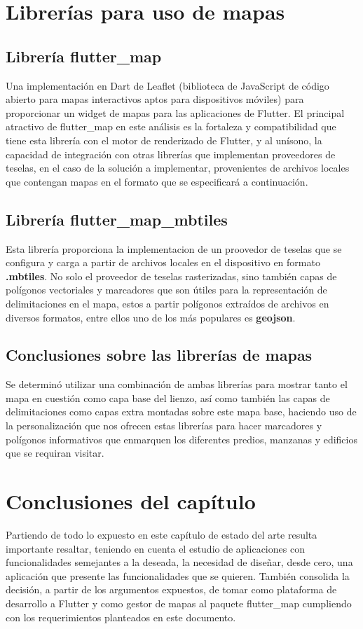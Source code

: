 \section{Librerías para uso de mapas}
\subsection{Librería flutter\_map}
Una implementación en Dart de Leaflet (biblioteca de JavaScript de código abierto
para mapas interactivos aptos para dispositivos móviles) para proporcionar un widget de
mapas para las aplicaciones de Flutter.
El principal atractivo de flutter\_map \cite{flutterMap} en este análisis es la fortaleza y compatibilidad que tiene esta librería con el motor de renderizado
de Flutter, y al unísono, la capacidad de integración con otras librerías que implementan proveedores de teselas, en el caso de la solución a implementar, provenientes de archivos locales
que contengan mapas en el formato que se especificará a continuación.
\subsection{Librería flutter\_map\_mbtiles}
Esta librería proporciona la implementacion de un proovedor de teselas que se configura y carga a partir de archivos locales
en el dispositivo en formato \textbf{.mbtiles}. No solo el proveedor de teselas rasterizadas, sino también capas de polígonos vectoriales y marcadores que son útiles
para la representación de delimitaciones en el mapa, estos a partir polígonos extraídos de archivos en diversos formatos, entre ellos uno de los más populares es \textbf{geojson}.


\subsection{Conclusiones sobre las librerías de mapas}
Se determinó utilizar una combinación de ambas librerías para mostrar tanto el mapa en cuestión como capa base del lienzo, así como también las capas de delimitaciones como
capas extra montadas sobre este mapa base, haciendo uso de la personalización que nos ofrecen estas librerías para hacer marcadores y polígonos informativos que enmarquen
los diferentes predios, manzanas y edificios que se requiran visitar.


\section{Conclusiones del capítulo}
Partiendo de todo lo expuesto en este capítulo de estado del arte resulta importante
resaltar, teniendo en cuenta el estudio de aplicaciones con funcionalidades semejantes
a la deseada, la necesidad de diseñar, desde cero, una aplicación que presente las funcionalidades que se quieren. También consolida la decisión, a partir de los argumentos
expuestos, de tomar como plataforma de desarrollo a Flutter y como gestor de mapas al
paquete flutter\_map cumpliendo con los requerimientos planteados en este documento.
